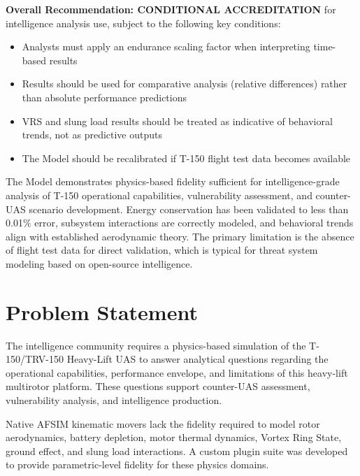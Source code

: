\documentclass[11pt, letterpaper]{article}
\begin{document}
\unclass \textbf{Overall Recommendation: CONDITIONAL ACCREDITATION} for intelligence analysis use, subject to the following key conditions:

\begin{itemize}
    \item \unclass Analysts must apply an endurance scaling factor when interpreting time-based results
    \item \unclass Results should be used for comparative analysis (relative differences) rather than absolute performance predictions
    \item \unclass VRS and slung load results should be treated as indicative of behavioral trends, not as predictive outputs
    \item \unclass The Model should be recalibrated if T-150 flight test data becomes available
\end{itemize}

\unclass The Model demonstrates physics-based fidelity sufficient for intelligence-grade analysis of T-150 operational capabilities, vulnerability assessment, and counter-UAS scenario development. Energy conservation has been validated to less than 0.01\% error, subsystem interactions are correctly modeled, and behavioral trends align with established aerodynamic theory. The primary limitation is the absence of flight test data for direct validation, which is typical for threat system modeling based on open-source intelligence.

\pagebreak


\section{\unclass Problem Statement}

\unclass The intelligence community requires a physics-based simulation of the T-150/TRV-150 Heavy-Lift UAS to answer analytical questions regarding the operational capabilities, performance envelope, and limitations of this heavy-lift multirotor platform. These questions support counter-UAS assessment, vulnerability analysis, and intelligence production.

\unclass Native AFSIM kinematic movers lack the fidelity required to model rotor aerodynamics, battery depletion, motor thermal dynamics, Vortex Ring State, ground effect, and slung load interactions. A custom plugin suite was developed to provide parametric-level fidelity for these physics domains.
\end{document}
